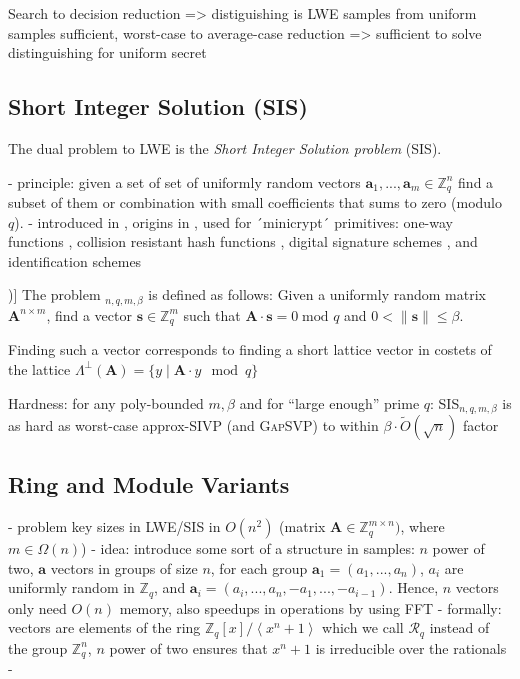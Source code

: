 \documentclass[
  a4paper,  %
  twoside,  %
  bibliography=totoc,
  headsepline,
  cleardoublepage=empty,
  parskip=half,
  draft=false
]{scrbook}
\begin{document}
Search to decision reduction => distiguishing is LWE samples from uniform samples sufficient, worst-case to average-case reduction => sufficient to solve distinguishing for uniform secret

\subsection{Short Integer Solution (SIS)}
The dual problem to LWE is the \textit{Short Integer Solution problem} (SIS).

- principle: given a set of set of uniformly random vectors $\textbf{a}_1, ..., \textbf{a}_m \in \mathbb{Z}_q^n$ find a subset of them or combination with small coefficients that sums to zero (modulo $q$). %
- introduced in \cite{MR04}, origins in \cite{Atj96}, used for ´minicrypt´ primitives: one-way functions \cite{Atj96}, collision resistant hash functions \cite{GGH96}, digital signature schemes \cite{GPV08, CHKP10}, and identification schemes \cite{MV03, Lyu08, KTX07} %

\begin{definition}[SIS Problem (Adapted from [\citealp{LS15}, Definition 3.1])]
  The problem $_{n, q, m, \beta}$ is defined as follows: Given a uniformly random matrix $\textbf{A}^{n\times m}$, find a vector $\textbf{s} \in \mathbb{Z}_q^m$ such that $\textbf{A} \cdot \textbf{s} = 0 \; \text{mod } q$ and $0 < \| \textbf{s}\| \leq \beta$.
\end{definition}

Finding such a vector corresponds to finding a short lattice vector in costets of the lattice $\Lambda^{\perp}(\textbf{A}) = \{ y \mid \textbf{A} \cdot y \mod q \}$ %

Hardness: for any poly-bounded $m, \beta$ and for ``large enough'' prime $q$: SIS$_{n, q, m, \beta}$ is as hard as worst-case approx-SIVP (and \textsc{GapSVP}) to within $\beta \cdot \tilde{O}(\sqrt{n})$ factor 

\subsection{Ring and Module Variants} 
- problem key sizes in LWE/SIS in $O(n^2)$ (matrix $\textbf{A} \in \mathbb{Z}_q^{m \times n})$, where $m \in \Omega(n)$)%
- idea: introduce some sort of a structure in samples: $n$ power of two, $\textbf{a}$ vectors in groups of size $n$, for each group $\textbf{a}_1 = (a_1, ..., a_n)$, $a_i$ are uniformly random in $\mathbb{Z}_q$, and $\textbf{a}_i = (a_i, ..., a_n, -a_1, ..., -a_{i-1})$. Hence, $n$ vectors only need $O(n)$ memory, also speedups in operations by using FFT %
- formally: vectors are elements of the ring $\mathbb{Z}_q\left[x\right] / \left\langle x^n + 1 \right\rangle$ which we call $\mathcal{R}_q$ instead of the group $\mathbb{Z}_q^n$, $n$ power of two ensures that $x^n + 1$ is irreducible over the rationals%
- %
\end{document}
